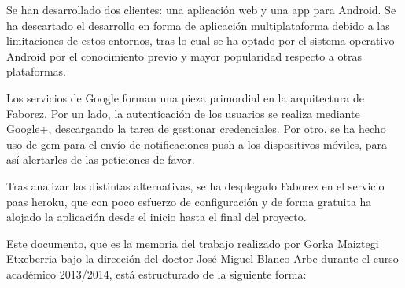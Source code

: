 \documentclass[main]{subfiles}
\begin{document}
Se han desarrollado dos clientes: una aplicación web y una \gls{app} para Android. Se ha descartado el desarrollo en forma de aplicación multiplataforma debido a las limitaciones de estos entornos, tras lo cual se ha optado por el sistema operativo Android por el conocimiento previo y mayor popularidad respecto a otras plataformas.

Los servicios de Google forman una pieza primordial en la arquitectura de Faborez. Por un lado, la autenticación de los usuarios se realiza mediante Google+, descargando la tarea de gestionar credenciales. Por otro, se ha hecho uso de \gls{gcm} para el envío de notificaciones \gls{push} a los dispositivos móviles, para así alertarles de las peticiones de favor.

Tras analizar las distintas alternativas, se ha desplegado Faborez en el servicio \gls{paas} \gls{heroku}, que con poco esfuerzo de configuración y de forma gratuita ha alojado la aplicación desde el inicio hasta el final del proyecto.


Este documento, que es la memoria del trabajo realizado por Gorka Maiztegi Etxeberria bajo la dirección del doctor José Miguel Blanco Arbe durante el curso académico 2013/2014, está estructurado de la siguiente forma:
\end{document}
